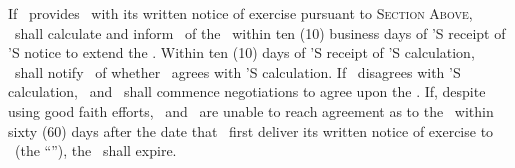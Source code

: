 If \lessee\ provides \lessor\ with its written notice of exercise pursuant to \textsc{Section Above}, \lessor\ shall calculate and inform \lessee\ of the \fmv\ within ten (10) business days of \lessor’S receipt of \lessee’S notice to extend the \leaseextensionterm. Within ten (10) days of \lessee’S receipt of \lessor’S calculation, \lessee\ shall notify \lessor\ of whether \lessee\ agrees with \lessor’S calculation. If \lessee\ disagrees with \lessor’S calculation, \lessor\ and \lessee\ shall commence negotiations to agree upon the \fmv. If, despite using good faith efforts, \lessor\ and \lessee\ are unable to reach agreement as to the \fmv\ within sixty (60) days after the date that \lessee\ first deliver its written notice of exercise to \lessor\ (the “\negPeriod”), the \optionI\ shall expire.

